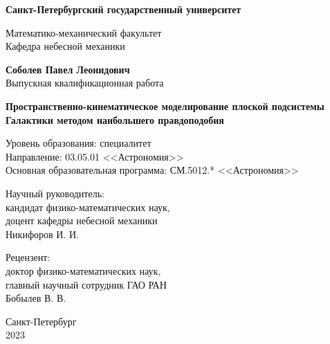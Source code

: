 \documentclass[a4paper, oneside, 14pt]{article}
\newcommand{\npar}{\par\vspace{\baselineskip}}
\begin{document}
\begin{titlepage}
  \begin{center}
    {
      \Large
      \textbf{Санкт-Петербургский государственный университет}

      Математико-механический факультет\\
      Кафедра небесной механики\par
    }

    \vfill

    {
      \Large
      \textbf{Соболев Павел Леонидович}\\
      Выпускная квалификационная работа\par
    }

    \vspace{0.5cm}

    {
      \LARGE
      \textbf{Пространственно-кинематическое моделирование плоской подсистемы Галактики методом наибольшего правдоподобия}
    }

    \vspace{0.5cm}

    {
      \Large

      Уровень образования: специалитет\\
      Направление: 03.05.01 <<Астрономия>>\\
      Основная образовательная программа: СМ.5012.* <<Астрономия>>\par
    }

    \vfill

    \begin{flushright}
      \Large

      Научный руководитель:\\
      кандидат физико-математических наук,\\
      доцент кафедры небесной механики\\
      Никифоров И. И.\npar

      Рецензент:\\
      доктор физико-математических наук,\\
      главный научный сотрудник ГАО РАН\\
      Бобылев В. В.\par

    \end{flushright}

    \vfill

    {
      \Large
      Санкт-Петербург\\
      2023\par
    }
  \end{center}
\end{titlepage}
\end{document}

